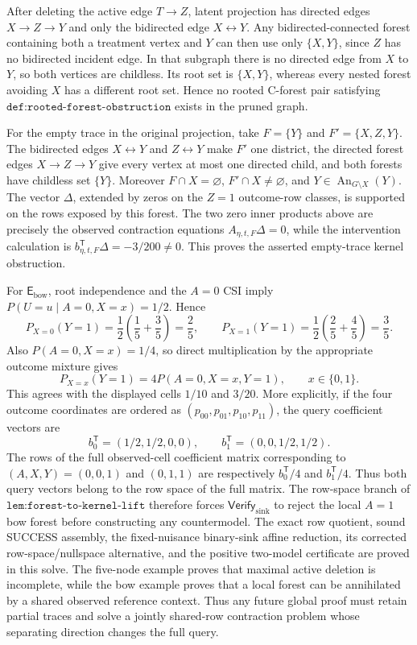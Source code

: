 After deleting the active edge \(T\to Z\), latent projection has directed edges \(X\to Z\to Y\) and only the bidirected edge \(X\leftrightarrow Y\). Any bidirected-connected forest containing both a treatment vertex and \(Y\) can then use only \(\{X,Y\}\), since \(Z\) has no bidirected incident edge. In that subgraph there is no directed edge from \(X\) to \(Y\), so both vertices are childless. Its root set is \(\{X,Y\}\), whereas every nested forest avoiding \(X\) has a different root set. Hence no rooted C-forest pair satisfying \(\texttt{def:rooted-forest-obstruction}\) exists in the pruned graph.

For the empty trace in the original projection, take \(F=\{Y\}\) and \(F'=\{X,Z,Y\}\). The bidirected edges \(X\leftrightarrow Y\) and \(Z\leftrightarrow Y\) make \(F'\) one district, the directed forest edges \(X\to Z\to Y\) give every vertex at most one directed child, and both forests have childless set \(\{Y\}\). Moreover \(F\cap X=\varnothing\), \(F'\cap X\ne\varnothing\), and \(Y\in\operatorname{An}_{G\setminus X}(Y)\). The vector \(\Delta\), extended by zeros on the \(Z=1\) outcome-row classes, is supported on the rows exposed by this forest. The two zero inner products above are precisely the observed contraction equations \(A_{\eta,t,F}\Delta=0\), while the intervention calculation is \(b_{\eta,t,F}^{\mathsf T}\Delta=-3/200\ne0\). This proves the asserted empty-trace kernel obstruction.

For \(\mathsf E_{\mathrm{bow}}\), root independence and the \(A=0\) CSI imply \(P(U=u\mid A=0,X=x)=1/2\). Hence
\[
 P_{X=0}(Y=1)=\frac12\left(\frac15+\frac35\right)=\frac25,
 \qquad
 P_{X=1}(Y=1)=\frac12\left(\frac25+\frac45\right)=\frac35.
\]
Also \(P(A=0,X=x)=1/4\), so direct multiplication by the appropriate outcome mixture gives
\[
 P_{X=x}(Y=1)=4P(A=0,X=x,Y=1),\qquad x\in\{0,1\}.
\]
This agrees with the displayed cells \(1/10\) and \(3/20\). More explicitly, if the four outcome coordinates are ordered as \((p_{00},p_{01},p_{10},p_{11})\), the query coefficient vectors are
\[
 b_0^{\mathsf T}=(1/2,1/2,0,0),
 \qquad
 b_1^{\mathsf T}=(0,0,1/2,1/2).
\]
The rows of the full observed-cell coefficient matrix corresponding to \((A,X,Y)=(0,0,1)\) and \((0,1,1)\) are respectively \(b_0^{\mathsf T}/4\) and \(b_1^{\mathsf T}/4\). Thus both query vectors belong to the row space of the full matrix. The row-space branch of \(\texttt{lem:forest-to-kernel-lift}\) therefore forces \(\mathsf{Verify}_{\mathrm{sink}}\) to reject the local \(A=1\) bow forest before constructing any countermodel.
The exact row quotient, sound SUCCESS assembly, the fixed-nuisance binary-sink affine reduction, its corrected row-space/nullspace alternative, and the positive two-model certificate are proved in this solve. The five-node example proves that maximal active deletion is incomplete, while the bow example proves that a local forest can be annihilated by a shared observed reference context. Thus any future global proof must retain partial traces and solve a jointly shared-row contraction problem whose separating direction changes the full query.
